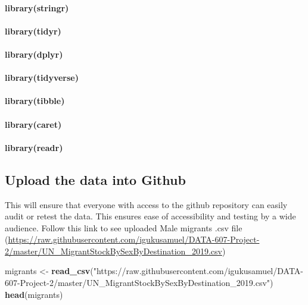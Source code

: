 \documentclass[]{article}
\newenvironment{Shaded}{\begin{snugshade}}{\end{snugshade}}
\newcommand{\KeywordTok}[1]{\textcolor[rgb]{0.13,0.29,0.53}{\textbf{#1}}}
\newcommand{\StringTok}[1]{\textcolor[rgb]{0.31,0.60,0.02}{#1}}
\newcommand{\NormalTok}[1]{#1}
\let\oldparagraph\paragraph
\renewcommand{\paragraph}[1]{\oldparagraph{#1}\mbox{}}
\begin{document}
\paragraph{library(stringr)}\label{librarystringr}

\paragraph{library(tidyr)}\label{librarytidyr}

\paragraph{library(dplyr)}\label{librarydplyr}

\paragraph{library(tidyverse)}\label{librarytidyverse}

\paragraph{library(tibble)}\label{librarytibble}

\paragraph{library(caret)}\label{librarycaret}

\paragraph{library(readr)}\label{libraryreadr}

\subsection{Upload the data into
Github}\label{upload-the-data-into-github}

This will ensure that everyone with access to the github repository can
easily audit or retest the data. This ensures ease of accessibility and
testing by a wide audience. Follow this link to see uploaded Male
migrants .csv file
(\url{https://raw.githubusercontent.com/igukusamuel/DATA-607-Project-2/master/UN_MigrantStockBySexByDestination_2019.csv})

\begin{Shaded}
\begin{Highlighting}[]
\NormalTok{migrants <-}\StringTok{ }\KeywordTok{read_csv}\NormalTok{(}\StringTok{"https://raw.githubusercontent.com/igukusamuel/DATA-607-Project-2/master/UN_MigrantStockBySexByDestination_2019.csv"}\NormalTok{)}
\KeywordTok{head}\NormalTok{(migrants)}
\end{Highlighting}
\end{Shaded}
\end{document}
